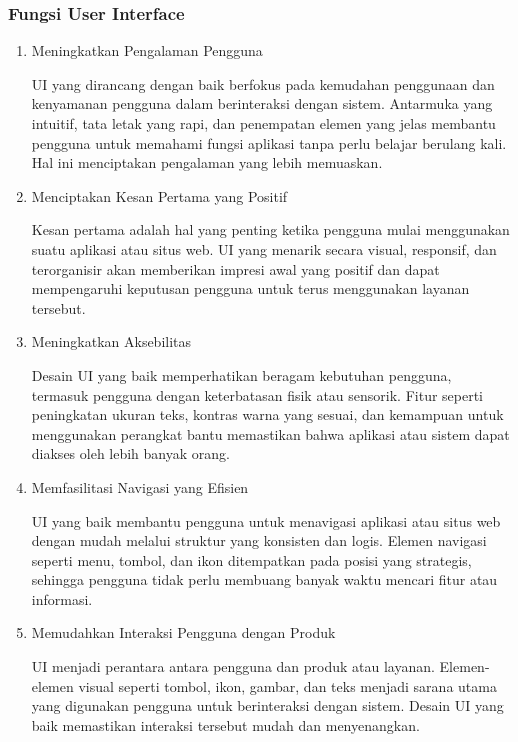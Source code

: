 \documentclass[12pt]{article}
\begin{document}
\subsubsection{Fungsi User Interface}
\begin{enumerate}
    \item Meningkatkan Pengalaman Pengguna 
    
    UI yang dirancang dengan baik berfokus pada kemudahan penggunaan dan kenyamanan pengguna dalam berinteraksi dengan sistem. Antarmuka yang intuitif, tata letak yang rapi, dan penempatan elemen yang jelas membantu pengguna untuk memahami fungsi aplikasi tanpa perlu belajar berulang kali. Hal ini menciptakan pengalaman yang lebih memuaskan.

    \item Menciptakan Kesan Pertama yang Positif

    Kesan pertama adalah hal yang penting ketika pengguna mulai menggunakan suatu aplikasi atau situs web. UI yang menarik secara visual, responsif, dan terorganisir akan memberikan impresi awal yang positif dan dapat mempengaruhi keputusan pengguna untuk terus menggunakan layanan tersebut.

    \item Meningkatkan Aksebilitas

    Desain UI yang baik memperhatikan beragam kebutuhan pengguna, termasuk pengguna dengan keterbatasan fisik atau sensorik. Fitur seperti peningkatan ukuran teks, kontras warna yang sesuai, dan kemampuan untuk menggunakan perangkat bantu memastikan bahwa aplikasi atau sistem dapat diakses oleh lebih banyak orang.

    \item Memfasilitasi Navigasi yang Efisien

    UI yang baik membantu pengguna untuk menavigasi aplikasi atau situs web dengan mudah melalui struktur yang konsisten dan logis. Elemen navigasi seperti menu, tombol, dan ikon ditempatkan pada posisi yang strategis, sehingga pengguna tidak perlu membuang banyak waktu mencari fitur atau informasi.

    \item Memudahkan Interaksi Pengguna dengan Produk

    UI menjadi perantara antara pengguna dan produk atau layanan. Elemen-elemen visual seperti tombol, ikon, gambar, dan teks menjadi sarana utama yang digunakan pengguna untuk berinteraksi dengan sistem. Desain UI yang baik memastikan interaksi tersebut mudah dan menyenangkan.
\end{enumerate}
\end{document}

